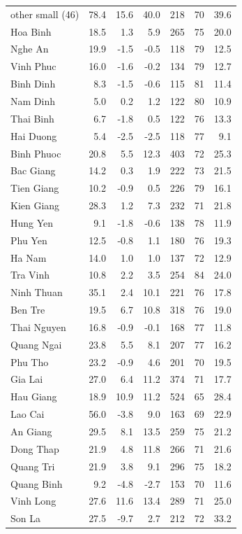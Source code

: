 {\begin{longtable}{lrrrrrr}
other small (46) & 78.4 & 15.6 & 40.0 & 218 & 70 & 39.6 \\
Hoa Binh & 18.5 & 1.3 & 5.9 & 265 & 75 & 20.0 \\
Nghe An & 19.9 & -1.5 & -0.5 & 118 & 79 & 12.5 \\
Vinh Phuc & 16.0 & -1.6 & -0.2 & 134 & 79 & 12.7 \\
Binh Dinh & 8.3 & -1.5 & -0.6 & 115 & 81 & 11.4 \\
Nam Dinh & 5.0 & 0.2 & 1.2 & 122 & 80 & 10.9 \\
Thai Binh & 6.7 & -1.8 & 0.5 & 122 & 76 & 13.3 \\
Hai Duong & 5.4 & -2.5 & -2.5 & 118 & 77 & 9.1 \\
Binh Phuoc & 20.8 & 5.5 & 12.3 & 403 & 72 & 25.3 \\
Bac Giang & 14.2 & 0.3 & 1.9 & 222 & 73 & 21.5 \\
Tien Giang & 10.2 & -0.9 & 0.5 & 226 & 79 & 16.1 \\
Kien Giang & 28.3 & 1.2 & 7.3 & 232 & 71 & 21.8 \\
Hung Yen & 9.1 & -1.8 & -0.6 & 138 & 78 & 11.9 \\
Phu Yen & 12.5 & -0.8 & 1.1 & 180 & 76 & 19.3 \\
Ha Nam & 14.0 & 1.0 & 1.0 & 137 & 72 & 12.9 \\
Tra Vinh & 10.8 & 2.2 & 3.5 & 254 & 84 & 24.0 \\
Ninh Thuan & 35.1 & 2.4 & 10.1 & 221 & 76 & 17.8 \\
Ben Tre & 19.5 & 6.7 & 10.8 & 318 & 76 & 19.0 \\
Thai Nguyen & 16.8 & -0.9 & -0.1 & 168 & 77 & 11.8 \\
Quang Ngai & 23.8 & 5.5 & 8.1 & 207 & 77 & 16.2 \\
Phu Tho & 23.2 & -0.9 & 4.6 & 201 & 70 & 19.5 \\
Gia Lai & 27.0 & 6.4 & 11.2 & 374 & 71 & 17.7 \\
Hau Giang & 18.9 & 10.9 & 11.2 & 524 & 65 & 28.4 \\
Lao Cai & 56.0 & -3.8 & 9.0 & 163 & 69 & 22.9 \\
An Giang & 29.5 & 8.1 & 13.5 & 259 & 75 & 21.2 \\
Dong Thap & 21.9 & 4.8 & 11.8 & 266 & 71 & 21.6 \\
Quang Tri & 21.9 & 3.8 & 9.1 & 296 & 75 & 18.2 \\
Quang Binh & 9.2 & -4.8 & -2.7 & 153 & 70 & 11.6 \\
Vinh Long & 27.6 & 11.6 & 13.4 & 289 & 71 & 25.0 \\
Son La & 27.5 & -9.7 & 2.7 & 212 & 72 & 33.2 \\
\end{longtable}}
